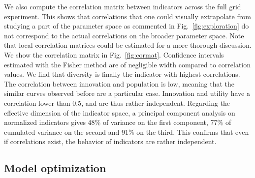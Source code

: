 \documentclass[letterpaper]{article}
\begin{document}


We also compute the correlation matrix between indicators across the full grid experiment. This shows that correlations that one could visually extrapolate from studying a part of the parameter space as commented in Fig.~\ref{fig:exploration} do not correspond to the actual correlations on the broader parameter space. Note that local correlation matrices could be estimated for a more thorough discussion. We show the correlation matrix in Fig.~\ref{fig:cormat}. Confidence intervals estimated with the Fisher method are of negligible width compared to correlation values. We find that diversity is finally the indicator with highest correlations. The correlation between innovation and population is low, meaning that the similar curves observed before are a particular case. Innovation and utility have a correlation lower than 0.5, and are thus rather independent. Regarding the effective dimension of the indicator space, a principal component analysis on normalized indicators gives 48\% of variance on the first component, 77\% of cumulated variance on the second and 91\% on the third. This confirms that even if correlations exist, the behavior of indicators are rather independent.




\subsection{Model optimization}
\end{document}
